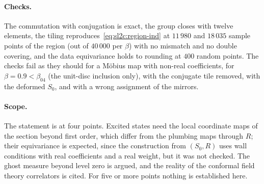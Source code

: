\paragraph{Checks.}
The commutation with conjugation is exact, the group closes with twelve elements, the tiling reproduces~\eqref{eq:sl2c:region-ind} at $11\,980$ and $18\,035$ sample points of the region (out of $40\,000$ per $\beta$) with no mismatch and no double covering, and the data equivariance holds to rounding at $400$ random points.
The checks fail as they should for a Möbius map with non-real coefficients, for $\beta = 0.9 < \beta_{04}$ (the unit-disc inclusion only), with the conjugate tile removed, with the deformed $S_0$, and with a wrong assignment of the mirrors.

\paragraph{Scope.}
The statement is at four points.
Excited states need the local coordinate maps of the section beyond first order, which differ from the plumbing maps through $R$; their equivariance is expected, since the construction from $(S_0, R)$ uses wall conditions with real coefficients and a real weight, but it was not checked.
The ghost measure beyond level zero is argued, and the reality of the conformal field theory correlators is cited.
For five or more points nothing is established here.
